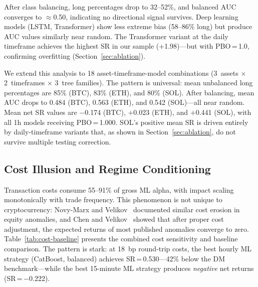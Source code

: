 \documentclass[sigconf,anonymous,review]{acmart}
\begin{document}
After class balancing, long percentages drop to 32--52\%, and balanced
AUC converges to $\approx$0.50, indicating no directional signal
survives. Deep learning models (LSTM, Transformer) show less extreme
bias (58--86\% long) but produce AUC values similarly near random. The
Transformer variant at the daily timeframe achieves the highest SR in
our sample (+1.98)---but with PBO\,=\,1.0, confirming overfitting
(Section~\ref{sec:ablation}).

We extend this analysis to 18 asset-timeframe-model combinations
(3~assets $\times$ 2~timeframes $\times$ 3~tree families). The
pattern is universal: mean unbalanced long percentages are 85\%
(BTC), 83\% (ETH), and 80\% (SOL). After balancing, mean AUC drops
to 0.484 (BTC), 0.563 (ETH), and 0.542 (SOL)---all near random.
Mean net SR values are $-$0.174 (BTC), $+$0.023 (ETH), and $+$0.441
(SOL), with all 1h models receiving PBO\,=\,1.000. SOL's positive
mean SR is driven entirely by daily-timeframe variants that, as
shown in Section~\ref{sec:ablation}, do not survive multiple
testing correction.


\subsection{Cost Illusion and Regime Conditioning}
\label{sec:cost}

Transaction costs consume 55--91\% of gross ML alpha, with impact
scaling monotonically with trade frequency. This phenomenon is not
unique to cryptocurrency: Novy-Marx and
Velikov~\cite{novymarx2016taxonomy} documented similar cost erosion
in equity anomalies, and Chen and Velikov~\cite{chen2023zeroing}
showed that after proper cost adjustment, the expected returns of
most published anomalies converge to zero.
Table~\ref{tab:cost-baseline} presents the combined cost sensitivity
and baseline comparison. The pattern is stark: at 18~bp round-trip
costs, the best hourly ML strategy (CatBoost, balanced) achieves
SR\,=\,0.530---42\% below the DM benchmark---while the best 15-minute
ML strategy produces \emph{negative} net returns (SR\,=\,$-$0.222).
\end{document}

